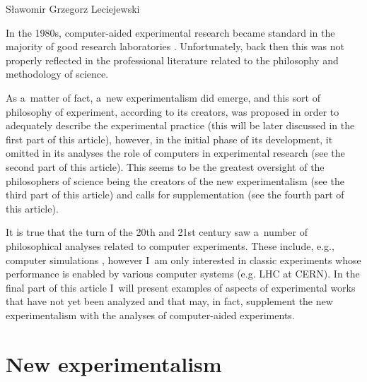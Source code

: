 \begin{artengenv}{Sławomir Grzegorz Leciejewski}
\enlargethispage{1.5\baselineskip}

In the 1980s, computer-aided experimental research became standard in the majority of good research laboratories 
\parencite[][]{crowley-milling_computer_1974}. %
 Unfortunately, back then this was not properly reflected in the professional literature related to the philosophy and methodology of science.



As a~matter of fact, a~new experimentalism did emerge, and this sort of philosophy of experiment, according to its creators, was proposed in order to adequately describe the experimental practice (this will be later discussed in the first part of this article), however, in the initial phase of its development, it omitted in its analyses the role of computers in experimental research (see the second part of this article). This seems to be the greatest oversight of the philosophers of science being the creators of the new experimentalism (see the third part of this article) and calls for supplementation (see the fourth part of this article).



It is true that the turn of the 20th and 21st century saw a~number of philosophical analyses related to computer experiments. These include, e.g., computer simulations 
\parencites[][]{bartz-beielstein_new_2005}[][]{giere_is_2009}[][]{guala_models_2002}[][]{morgan_ising_1999}[][]{humphreys_computational_1995}[][]{morgan_experiments_2003}[][]{peschard_modeling_2009}[][]{winsberg_science_2010}[][]{burge_computer_1998}[][]{epstein_agent-based_1999}[][]{hartmann_world_1996}[][]{lenhard_computer_2007}[][]{morrison_models_2009}[][]{parker_computer_2013}, %
 however I~am only interested in classic experiments whose performance is enabled by various computer systems (e.g. LHC at CERN). In the final part of this article I~will present examples of aspects of experimental works that have not yet been analyzed and that may, in fact, supplement the new experimentalism with the analyses of computer-aided experiments.

\enlargethispage{2\baselineskip}

\section*{New experimentalism}


\end{artengenv}
